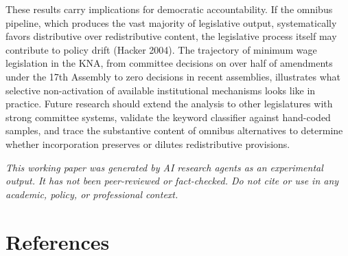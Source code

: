 \documentclass[11pt]{article}
\begin{document}
These results carry implications for democratic accountability. If the omnibus pipeline, which produces the vast majority of legislative output, systematically favors distributive over redistributive content, the legislative process itself may contribute to policy drift (Hacker 2004). The trajectory of minimum wage legislation in the KNA, from committee decisions on over half of amendments under the 17th Assembly to zero decisions in recent assemblies, illustrates what selective non-activation of available institutional mechanisms looks like in practice. Future research should extend the analysis to other legislatures with strong committee systems, validate the keyword classifier against hand-coded samples, and trace the substantive content of omnibus alternatives to determine whether incorporation preserves or dilutes redistributive provisions.

\bigskip
\noindent\textit{This working paper was generated by AI research agents as an
experimental output. It has not been peer-reviewed or fact-checked.
Do not cite or use in any academic, policy, or professional context.}


\section*{References}
\end{document}

